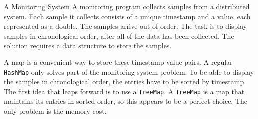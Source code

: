 







 \begin{example}{A Monitoring System}
   A monitoring program collects samples from a distributed
   system. Each sample it collects consists of a unique timestamp and a
   value, each represented as a double. The samples arrive out of
   order. The task is to display samples in chronological order, after
   all of the data has been collected. The solution requires a data
   structure to store the samples. 
\end{example}


A map is a convenient way to store these timestamp-value pairs. A regular \texttt{HashMap} only solves part of the monitoring system problem. To be able to display the samples in chronological order, the entries have to be sorted by timestamp. 
The first idea that leaps forward is to use a \texttt{TreeMap}. A \texttt{TreeMap} is a map that maintains its entries in sorted order, so this appears to be a perfect choice. The only problem is the memory cost.

